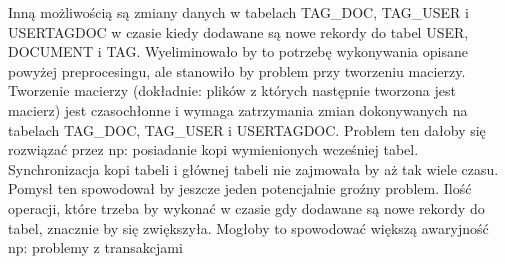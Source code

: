\documentclass[11pt,a4paper]{report}
\begin{document}
Inną możliwością są zmiany danych w tabelach TAG\_DOC, TAG\_USER i USERTAGDOC w czasie kiedy dodawane są nowe rekordy do tabel USER, DOCUMENT i TAG. Wyeliminowało by to potrzebę wykonywania opisane powyżej preprocesingu, ale stanowiło by problem przy tworzeniu macierzy. Tworzenie macierzy (dokładnie: plików z których następnie tworzona jest macierz) jest czasochłonne i wymaga zatrzymania zmian dokonywanych na tabelach TAG\_DOC, TAG\_USER i USERTAGDOC. Problem ten dałoby się rozwiązać przez np: posiadanie kopi wymienionych wcześniej tabel. Synchronizacja kopi tabeli i głównej tabeli nie zajmowała by aż tak wiele czasu. Pomysł ten spowodował by jeszcze jeden potencjalnie groźny problem. Ilość operacji, które trzeba by wykonać w czasie gdy dodawane są nowe rekordy do tabel, znacznie by się zwiększyła. Mogłoby to spowodować większą awaryjność np: problemy z transakcjami
\end{document}
